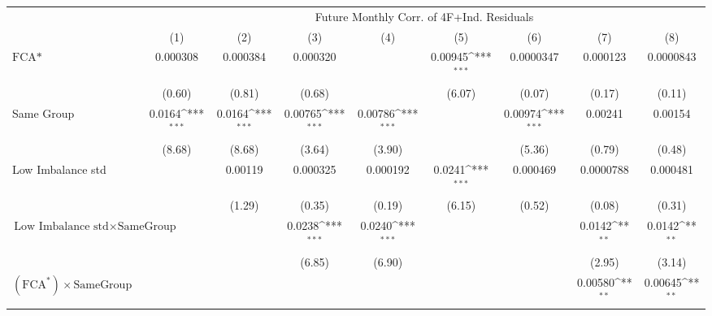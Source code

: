 {
\def\sym#1{\ifmmode^{#1}\else\(^{#1}\)\fi}
\begin{tabular}{l*{8}{c}}
\hline\hline
                &\multicolumn{8}{c}{Future Monthly Corr. of 4F+Ind. Residuals}                                                                                          \\\cmidrule(lr){2-9}
                &\multicolumn{1}{c}{(1)}         &\multicolumn{1}{c}{(2)}         &\multicolumn{1}{c}{(3)}         &\multicolumn{1}{c}{(4)}         &\multicolumn{1}{c}{(5)}         &\multicolumn{1}{c}{(6)}         &\multicolumn{1}{c}{(7)}         &\multicolumn{1}{c}{(8)}         \\
\hline
$ \text{FCA*} $ & 0.000308         & 0.000384         & 0.000320         &                  &  0.00945\sym{***}&0.0000347         & 0.000123         &0.0000843         \\
                &   (0.60)         &   (0.81)         &   (0.68)         &                  &   (6.07)         &   (0.07)         &   (0.17)         &   (0.11)         \\
[1em]
Same Group      &   0.0164\sym{***}&   0.0164\sym{***}&  0.00765\sym{***}&  0.00786\sym{***}&                  &  0.00974\sym{***}&  0.00241         &  0.00154         \\
                &   (8.68)         &   (8.68)         &   (3.64)         &   (3.90)         &                  &   (5.36)         &   (0.79)         &   (0.48)         \\
[1em]
Low Imbalance std&                  &  0.00119         & 0.000325         & 0.000192         &   0.0241\sym{***}& 0.000469         &0.0000788         & 0.000481         \\
                &                  &   (1.29)         &   (0.35)         &   (0.19)         &   (6.15)         &   (0.52)         &   (0.08)         &   (0.31)         \\
[1em]
 $ \text{Low Imbalance std} \times {\text{SameGroup} } $ &                  &                  &   0.0238\sym{***}&   0.0240\sym{***}&                  &                  &   0.0142\sym{**} &   0.0142\sym{**} \\
                &                  &                  &   (6.85)         &   (6.90)         &                  &                  &   (2.95)         &   (3.14)         \\
[1em]
 $ (\text{FCA}^*) \times {\text{SameGroup} }  $ &                  &                  &                  &                  &                  &                  &  0.00580\sym{**} &  0.00645\sym{**} \\

\end{tabular}}
